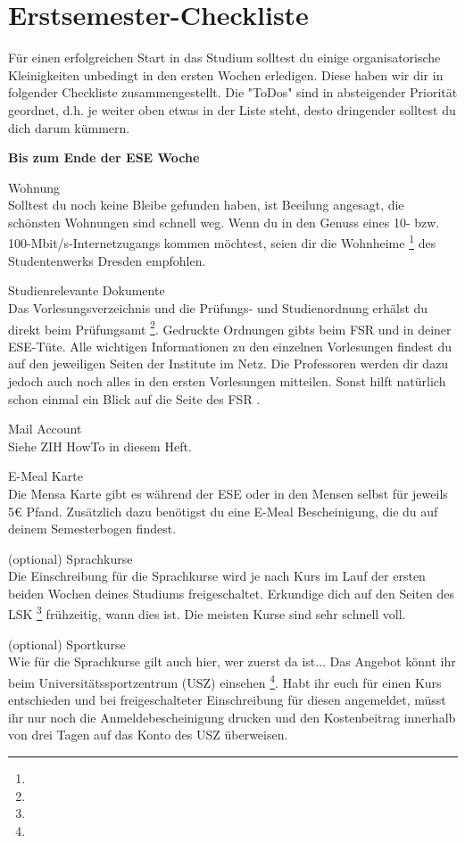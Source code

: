 \section{Erstsemester-Checkliste}

Für einen erfolgreichen Start in das Studium solltest du einige organisatorische Kleinigkeiten unbedingt in den ersten Wochen erledigen. Diese haben wir dir in folgender Checkliste zusammengestellt. Die "ToDos" sind in absteigender Priorität geordnet, d.h. je weiter oben etwas in der Liste steht, desto dringender solltest du dich darum kümmern.

\textbf{Bis zum Ende der ESE Woche}

Wohnung \\
Solltest du noch keine Bleibe gefunden haben, ist Beeilung angesagt, die schönsten Wohnungen sind schnell weg. Wenn du in den Genuss eines 10- bzw. 100-Mbit/s-Internetzugangs kommen möchtest, seien dir die Wohnheime \footnote{} des Studentenwerks Dresden empfohlen.

Studienrelevante Dokumente \\
Das Vorlesungsverzeichnis und die Prüfungs- und Studienordnung erhälst du direkt beim Prüfungsamt \footnote{}. Gedruckte Ordnungen gibts beim FSR und in deiner ESE-Tüte. Alle wichtigen Informationen zu den einzelnen Vorlesungen findest du auf den jeweiligen Seiten der Institute im Netz. Die Professoren werden dir dazu jedoch auch noch alles in den ersten Vorlesungen mitteilen. Sonst hilft natürlich schon einmal ein Blick auf die Seite des FSR \foonote{}.

Mail Account \\
Siehe ZIH HowTo in diesem Heft.

E-Meal Karte \\
Die Mensa Karte gibt es während der ESE oder in den Mensen selbst für jeweils 5€ Pfand. Zusätzlich dazu benötigst du eine E-Meal Bescheinigung, die du auf deinem Semesterbogen findest.

(optional) Sprachkurse \\
Die Einschreibung für die Sprachkurse wird je nach Kurs im Lauf der ersten beiden Wochen deines Studiums freigeschaltet. Erkundige dich auf den Seiten des LSK \footnote{} frühzeitig, wann dies ist. Die meisten Kurse sind sehr schnell voll.

(optional) Sportkurse \\
Wie für die Sprachkurse gilt auch hier, wer zuerst da ist... Das Angebot könnt ihr beim Universitätssportzentrum (USZ) einsehen \footnote{}. Habt ihr euch für einen Kurs entschieden und bei freigeschalteter Einschreibung für diesen angemeldet, müsst ihr nur noch die Anmeldebescheinigung drucken und den Kostenbeitrag innerhalb von drei Tagen auf das Konto des USZ überweisen.


